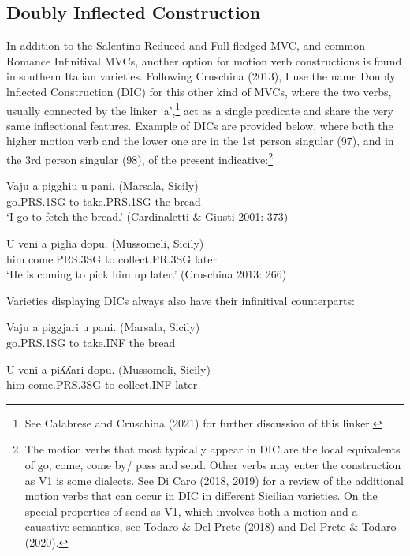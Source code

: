 \documentclass[output=paper,colorlinks,citecolor=brown,
]{langscibook}
\begin{document}
\subsection{Doubly Inflected Construction}

In addition to the Salentino Reduced and Full-fledged MVC, and common Romance Infinitival MVCs, another option for motion verb constructions is found in southern Italian varieties. Following Cruschina (2013), I use the name Doubly lnflected Construction (DIC) for this other kind of MVCs, where the two verbs, usually connected by the linker ‘a’,\footnote{See Calabrese and Cruschina (2021) for further discussion of this linker.}  act as a single predicate and share the very same inflectional features. Example of DICs are provided below, where both the higher motion verb and the lower one are in the 1st person singular (97), and in the 3rd person singular (98), of the present indicative:\footnote{The motion verbs that most typically appear in DIC are the local equivalents of go, come, come by/ pass and send. Other verbs may enter the construction as V1 is some dialects. See Di Caro (2018, 2019) for a review of the additional motion verbs that can occur in DIC in different Sicilian varieties. On the special properties of send as V1, which involves both a motion and a causative semantics, see Todaro \& Del Prete (2018) and Del Prete \& Todaro (2020).}

\ea 
\gll Vaju    a   pigghiu    u   pani.    (Marsala, Sicily)\\
   go.PRS.1SG to   take.PRS.1SG  the  bread \\
 \glt  ‘I go to fetch the bread.’ \hfill (Cardinaletti \& Giusti 2001: 373)
\z

\ea \gll  U   veni      a  piglia   dopu.      (Mussomeli, Sicily)\\
   him  come.PRS.3SG  to  collect.PR.3SG later\\
\glt   ‘He is coming to pick him up later.’ \hfill  (Cruschina 2013: 266)
\z

Varieties displaying DICs always also have their infinitival counterparts:

\ea \gll Vaju    a  piggjari u     pani.    (Marsala, Sicily)\\
go.PRS.1SG to  take.INF the    bread \\
\z
   
\ea \gll U   veni      a   piʎʎari   dopu.   (Mussomeli, Sicily)\\
him  come.PRS.3SG to   collect.INF later\\
\z
\end{document}

